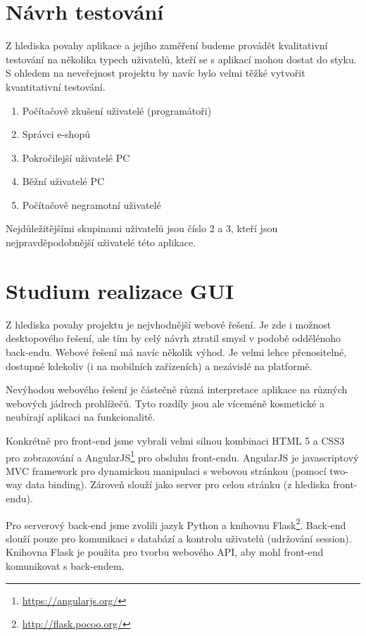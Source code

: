 \documentclass[11pt,a4paper]{article}
\begin{document}

\section*{Návrh testování}
Z hlediska povahy aplikace a jejího zaměření budeme provádět kvalitativní testování na několika typech uživatelů, kteří se s aplikací mohou dostat do styku. S ohledem na neveřejnost projektu by navíc bylo velmi těžké vytvořit kvantitativní testování.
\begin{enumerate}
	\item{Počítačově zkušení uživatelé (programátoři)}
	\item{Správci e-shopů}
	\item{Pokročilejší uživatelé PC}
	\item{Běžní uživatelé PC}
	\item{Počítačově negramotní uživatelé}
\end{enumerate}

Nejdůležitějšími skupinami uživatelů jsou číslo 2 a 3, kteří jsou nejpravděpodobnější uživatelé této aplikace. 

\section*{Studium realizace GUI}
Z hlediska povahy projektu je nejvhodnější webové řešení. Je zde i možnost desktopového řešení, ale tím by celý návrh ztratil smysl v podobě oddělénoho back-endu. Webové řešení má navíc několik výhod. Je velmi lehce přenositelné, dostupné kdekoliv (i na mobilních zařízeních) a nezávislé na platformě.

Nevýhodou webového řešení je částečně různá interpretace aplikace na různých webových jádrech prohlížečů. Tyto rozdíly jsou ale víceméně kosmetické a neubírají aplikaci na funkcionalitě.

Konkrétně pro front-end jsme vybrali velmi silnou kombinaci HTML 5 a CSS3 pro zobrazování a AngularJS\footnote{\url{https://angularjs.org/}} pro obsluhu front-endu. AngularJS je javascriptový MVC framework pro dynamickou manipulaci s webovou stránkou (pomocí two-way data binding). Zároveň slouží jako server pro celou stránku (z hlediska front-endu).

Pro serverový back-end jsme zvolili jazyk Python a knihovnu Flask\footnote{\url{http://flask.pocoo.org/}}. Back-end slouží pouze pro komunikaci s databází a kontrolu uživatelů (udržování session). Knihovna Flask je použita pro tvorbu webového API, aby mohl front-end komunikovat s back-endem. 
\end{document}

